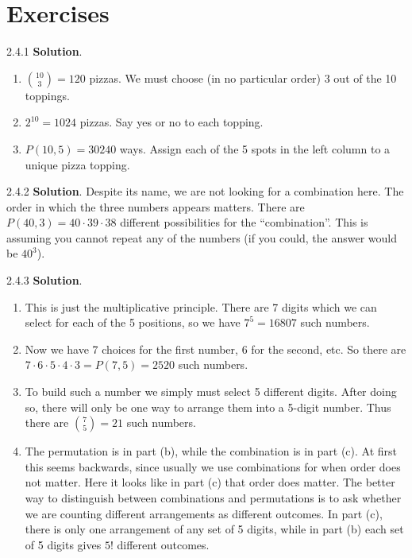 \documentclass[11pt,]{book}
\theoremstyle{ptxplainnotitle}
\theoremstyle{ptxplaintitle}
\theoremstyle{ptxdefinitionnotitle}
\theoremstyle{ptxdefinitiontitle}
\theoremstyle{ptxdefinitionnotitle}
\theoremstyle{ptxdefinitiontitle}
\theoremstyle{ptxdefinitionnotitle}
\theoremstyle{ptxdefinitiontitle}
\theoremstyle{ptxdefinitiontitlenonumber}
\theoremstyle{ptxdefinitiontitlenonumber}
\numberwithin{equation}{chapter}
\begin{document}
\section*{Exercises}
\begin{divisionexercise}{2.4.1}
\textbf{Solution}.\quad%
\hypertarget{p-1470}{}%
\leavevmode%
\begin{enumerate}[label=\alph*.]
\item\hypertarget{li-636}{}\hypertarget{p-1471}{}%
\({10 \choose 3} = 120\) pizzas.  We must choose (in no particular order) 3 out of the 10 toppings.%
\item\hypertarget{li-637}{}\hypertarget{p-1472}{}%
\(2^{10} = 1024\) pizzas.  Say yes or no to each topping.%
\item\hypertarget{li-638}{}\hypertarget{p-1473}{}%
\(P(10,5) = 30240\) ways.  Assign each of the 5 spots in the left column to a unique pizza topping.%
\end{enumerate}
%
\end{divisionexercise}%
\begin{divisionexercise}{2.4.2}
\textbf{Solution}.\quad%
\hypertarget{p-1479}{}%
Despite its name, we are not looking for a combination here. The order in which the three numbers appears matters. There are \(P(40,3) = 40\cdot 39 \cdot 38\) different possibilities for the ``combination''. This is assuming you cannot repeat any of the numbers (if you could, the answer would be \(40^3\)).%
\end{divisionexercise}%
\begin{divisionexercise}{2.4.3}
\textbf{Solution}.\quad%
\hypertarget{p-1498}{}%
\leavevmode%
\begin{enumerate}[label=\alph*.]
\item\hypertarget{li-647}{}\hypertarget{p-1499}{}%
This is just the multiplicative principle. There are 7 digits which we can select for each of the 5 positions, so we have \(7^5 = 16807\) such numbers.%
\item\hypertarget{li-648}{}\hypertarget{p-1500}{}%
Now we have 7 choices for the first number, 6 for the second, etc. So there are \(7 \cdot 6 \cdot 5 \cdot 4 \cdot 3 = P(7,5) = 2520\) such numbers.%
\item\hypertarget{li-649}{}\hypertarget{p-1501}{}%
To build such a number we simply must select 5 different digits. After doing so, there will only be one way to arrange them into a 5-digit number. Thus there are \({7 \choose 5} = 21\) such numbers.%
\item\hypertarget{li-650}{}\hypertarget{p-1502}{}%
The permutation is in part (b), while the combination is in part (c). At first this seems backwards, since usually we use combinations for when order does not matter. Here it looks like in part (c) that order does matter. The better way to distinguish between combinations and permutations is to ask whether we are counting different arrangements as different outcomes. In part (c), there is only one arrangement of any set of 5 digits, while in part (b) each set of 5 digits gives \(5!\) different outcomes.%
\end{enumerate}
%
\end{divisionexercise}%
\end{document}
